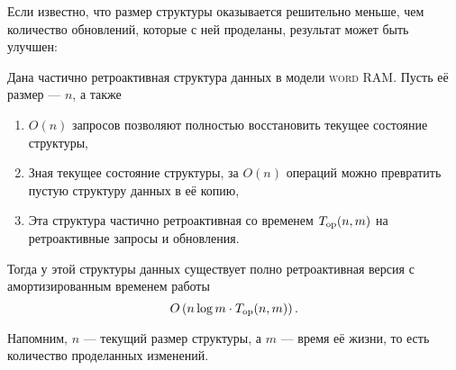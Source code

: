 Если известно, что размер структуры оказывается решительно меньше, чем количество обновлений, которые с ней проделаны, результат может быть улучшен:

\begin{theorem}
	Дана частично ретроактивная структура данных в модели {\scshape word RAM}. Пусть её размер — $n$, а также
     \begin{enumerate}
	\item $O(n)$ запросов позволяют полностью восстановить текущее состояние структуры,
	\item Зная текущее состояние структуры, за $O(n)$ операций можно превратить пустую структуру данных в её копию,
	\item Эта структура частично ретроактивная со временем $T_{\mathrm{op}} (n,m)$ на ретроактивные запросы и обновления.
     \end{enumerate}

	Тогда у этой структуры данных существует полно ретроактивная версия с амортизированным временем работы
     \begin{equation*}
	O \left( n \log m \cdot T_{\mathrm{op}} (n,m) \right).
     \end{equation*}

	Напомним, $n$ — текущий размер структуры, а $m$ — время её жизни, то есть количество проделанных изменений.
\end{theorem}

